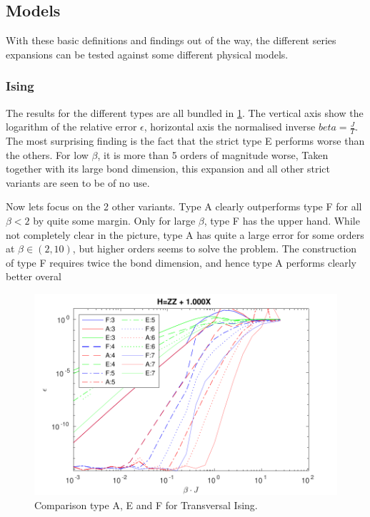 \subsection{Models}

With these basic definitions and findings out of the way, the different series expansions can be tested against some different physical models.

\subsubsection{Ising}

The results for the different types are all bundled in \cref{fig:benchmark:tising}. The vertical axis show the logarithm of the relative error $\epsilon$, horizontal axis the normalised inverse $beta= \frac{J}{T}$. The most surprising finding is the fact that the strict type E performs worse than the others. For low $\beta$, it is more than 5 orders of magnitude worse, Taken together with its large bond dimension, this expansion  and all other strict variants are seen to be of no use.

Now lets focus on the 2 other variants. Type A clearly outperforms type F for all $\beta<2$ by quite some margin. Only for large $\beta$, type F has the upper hand. While not completely clear in the picture, type A has quite a large error for some orders at $\beta \in (2,10) $, but higher orders seems to solve the problem. The construction of type F requires twice the bond dimension, and hence type A performs clearly better overal

\begin{figure}
    \center
    \includegraphics[width=\textwidth]{Figuren/benchmarking/t_ising.pdf}
    \caption{Comparison type A, E and F for Transversal Ising. }
    \label{fig:benchmark:tising}
\end{figure}

